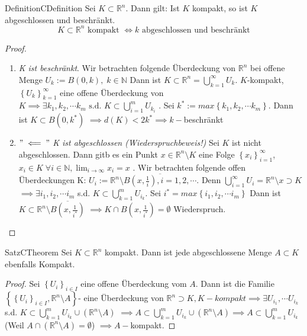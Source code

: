 \begin{ibox}[21]{Definition}{CDefinition}
    Sei $ K \subset \mathbb{R}^n  $. Dann gilt: Ist $ K $ kompakt, so ist $ K $ abgeschlossen und
	beschränkt.
	$$ K \subset  \mathbb{R}^n \text{ kompakt } \iff k \text{ abgeschlossen und beschränkt}  $$
\end{ibox}

\begin{proof}
\begin{enumerate}[label=\alph*)]
	\item \textit{ K ist beschränkt}. Wir betrachten folgende Überdeckung von $ \mathbb{R}^n  $ bei
		offene Menge $ U_{k} := B(0,k), \; k \in \mathbb{N}  $ Dann ist $ K \subset \mathbb{R}^n 
		= \bigcup\limits_{k = 1}^{\infty} U_{k} $. $ K $-kompakt,
		$ \left\{ U_{k} \right\}_{k=1}^{\infty} $ eine offene Überdeckung von $ K \implies \exists 
		k_1, k_2, \cdots k_{m} \text{ s.d. } K \subset  \bigcup\limits_{i=1}^{m} U_{k_{i}} $ .
		Sei $ k^{*} := max \left\{ k_1, k_2, \cdots k_{m} \right\}  $. Dann ist $ K \subset B(0,k^*)$ 
		$ \implies  d(K) < 2k^* \implies k- $beschränkt 
	\item $ " \impliedby" $ \textit{K ist abgeschlossen (Wiederspruchbeweis!)} Sei $ K $ ist nicht
		abgeschlossen. Dann gitb es ein Punkt $ x \in \mathbb{R}^n \setminus K $ eine Folge
		$ \left\{ x_{i} \right\}_{i=1}^\infty $, $ x_{i} \in K \; \forall i \in  \mathbb{N}
		, \lim_{i \to
		\infty} x_i = x$ . Wir betrachten folgende offen Überdeckungen K:
		$ U_i := \mathbb{R}^n  \setminus \overline{B \left( x, \frac{1}{i}  \right) ,
		i = 1, 2 , \cdots}   $. Denn $ \bigcup\limits_{i=1}^{\infty} U_i = \mathbb{R}^n \setminus
		{x} \supset K $ $ \implies \exists i_1,i_2, \cdots i_{m} $ s.d. $ K \subset
		\bigcup\limits_{k=1}^{m} U_{i_{k}} $. Sei $ i^* = max \left\{ i_1,i_2, \cdots i_{m} \right\}$
		Dann ist $ K \subset \mathbb{R}^n \setminus \overline{B \left( x, \frac{1}{i^*}  \right) } $ 
		$ \implies K \cap B \left( x, \frac{1}{i^*}  \right) = \emptyset  $ Wiederspruch.
\end{enumerate}
\end{proof}

\begin{ibox}[22]{Satz}{CTheorem}
    Sei $ K \subset  \mathbb{R}^n  $ kompakt. Dann ist jede abgeschlossene Menge $ A \subset K $ 
	ebenfalls Kompakt.
\end{ibox}
\begin{proof}
	Sei $ \left\{ U_i \right\}_{i \in  I} $ eine offene Überdeckung vom $ A $. Dann ist die Familie
	$ \left\{ \left\{ U_i \right\}_{i \in  I}, \mathbb{R}^n \setminus A \right\}  $- eine Überdeckung
	von $ \mathbb{R}^n \supset K, K-kompakt \implies \exists U_{i_{1}}, \cdots U_{i_{k}} $ 
	s.d. $ K \subset  \bigcup\limits_{k=1}^{m} U_{i_{k}} \cup \left( \mathbb{R}^n \setminus A \right)$
	$ \implies A \subset  \bigcup\limits_{k=1}^{m} U_{i_{k}} \cup \left( \mathbb{R}^n \setminus
	A \right) \implies A \subset \bigcup\limits_{k=1}^{m} U_{i_{k}}   $ (Weil $ A \cap 
	\left( \mathbb{R}^n \setminus A \right) = \emptyset $) $ \implies A- $kompakt. 
\end{proof}

